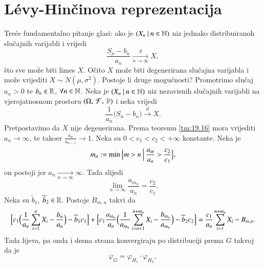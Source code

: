 
\chapter{L\' evy-Hin\v cinova reprezentacija}

Tre\' ce fundamentalno pitanje glasi: ako je $({X_n} \: | \: {n \in \mathbb{N}})$ niz jednako distribuiranoh slu\v cajnih varijabli i vrijedi
\begin{equation*}
    \frac{S_n - b_n}{a_n} \xrightarrow[n \to \infty]{d} X,
\end{equation*}
\v sto sve mo\v ze biti limes $X$.
O\v cito $X$ mo\v ze biti degenerirana slu\v cajna varijabla i mo\v ze vrijediti $X \sim N(\mu, \sigma^2)$.
Postoje li druge mogu\' cnosti?
Promotrimo slu\v caj $a_n > 0$ te $b_n \in \mathbb{R}$, $\forall n \in \mathbb{N}$.
Neka je $({X_n} \: | \: {n \in \mathbb{N}})$ niz nezavisnih slu\v cajnih varijabli na vjerojatnosnom prostoru $(\Omega, \: \mathcal{F}, \: \mathbb{P})$ i neka vrijedi
\begin{equation*}
    \frac{1}{a_n} \big( S_n - b_n \big) \xrightarrow{d} X.
\end{equation*} 
Pretpostavimo da $X$ nije degenerirana.
Prema teoremu \ref{tm:19.16} mora vrijediti $a_n \to \infty$, te tako\dj er $\frac{a_n}{a_{n - 1}} \to 1$.
Neka su $0 < c_1 < c_2 < +\infty$ konstante.
Neka je
\begin{equation*}
    m_n := \min \Big\{ {m > n} \: \Big| \: {\frac{a_m}{a_n} > \frac{c_2}{c_1}} \Big\},
\end{equation*}
on postoji jer $a_n \xrightarrow[n \to \infty]{} \infty$.
Tada slijedi
\begin{equation*}
    \lim\limits_{n \to \infty} \frac{a_{m_n}}{a_n} = \frac{c_2}{c_1}.
\end{equation*}
Neka su $\widetilde{b}_1$, $\widetilde{b}_2 \in \mathbb{R}$.
Postoje $B_{m, n}$ takvi da
\begin{equation*}
    \Big[c_1 \Big( \frac{1}{a_n} \sum\limits_{i = 1}^{n} X_i - \frac{b_n}{a_n} \Big) - \widetilde{b}_1 c_1 \Big]
    + \Big[ c_1 \frac{a_{m_n}}{a_n} \Big( \frac{1}{a_{m_n}} \sum\limits_{i = n + 1}^{n + m_n} X_i - \frac{b_{m_n}}{a_{m_n}} \Big) - \widetilde{b}_2 c_2 \Big]
    = \frac{c_1}{a_n} \sum\limits_{i = 1}^{n + m_n} X_i - B_{m, n}.
\end{equation*}
Tada lijeva, pa onda i desna strana konvergiraju po distribuciji prema $G$ takvoj da je
\begin{equation*}
    \varphi_G = \varphi_{H_1} \cdot \varphi_{H_2},
\end{equation*}
